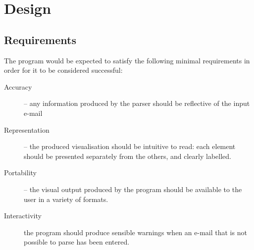 \chapter{Design}
\section{Requirements}
The program would be expected to satisfy the following minimal requirements
in order for it to be considered successful: 
\begin{description}
\item [{Accuracy}]  -- any information produced by the parser should be reflective of the input e-mail
\item [{Representation}] -- the produced visualisation should be intuitive to read: each element should be presented separately from the others, and clearly labelled. 
\item [{Portability}] -- the visual output produced by the program should be available to the user in a variety of formats. 
\item [{Interactivity}] the program should produce sensible warnings when
an e-mail that is not possible to parse has been entered. 
\end{description}

